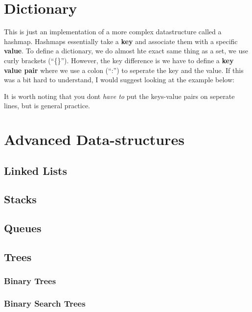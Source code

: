 \documentclass[12pt,a4paper]{book}
\begin{document}
			


		\section{Dictionary} \label{sec:dictionary}
			This is just an implementation of a more complex datastructure called a hashmap. Hashmaps essentially take a \textbf{key} and associate them with a specific \textbf{value}. To define a dictionary, we do almost hte exact same thing as a set, we use curly brackets (``\{\}''). However, the key difference is we have to define a \textbf{key value pair} where we use a colon (``:'') to seperate the key and the value. If this was a bit hard to understand, I would suggest looking at the example below:
			
			

			It is worth noting that you dont \textit{have to} put the keys-value pairs on seperate lines, but is general practice.
			
		\section{Advanced Data-structures}
			\subsection{Linked Lists}

			\subsection{Stacks}

			\subsection{Queues}

			\subsection{Trees}
				\subsubsection{Binary Trees}

				\subsubsection{Binary Search Trees}
\end{document}

